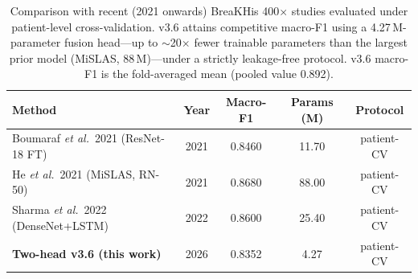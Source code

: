\begin{table}[t]
\centering
\small
\caption{Comparison with recent (2021 onwards) BreaKHis 400$\times$ studies evaluated under
patient-level cross-validation. v3.6 attains competitive macro-F1 using a 4.27\,M-parameter
fusion head---up to $\sim$20$\times$ fewer trainable parameters than the largest prior model
(MiSLAS, 88\,M)---under a strictly leakage-free protocol. v3.6 macro-F1 is the fold-averaged
mean (pooled value 0.892).}
\label{tab:sota_patient_cv_comparison}
\begin{tabular}{lcccc}
\toprule
\textbf{Method} & \textbf{Year} & \textbf{Macro-F1} & \textbf{Params (M)} & \textbf{Protocol} \\
\midrule
Boumaraf \textit{et al.}\ 2021 (ResNet-18 FT) & 2021 & 0.8460 & 11.70 & patient-CV \\
He \textit{et al.}\ 2021 (MiSLAS, RN-50) & 2021 & 0.8680 & 88.00 & patient-CV \\
Sharma \textit{et al.}\ 2022 (DenseNet+LSTM) & 2022 & 0.8600 & 25.40 & patient-CV \\
\textbf{Two-head v3.6 (this work)} & 2026 & 0.8352 & 4.27 & patient-CV \\
\bottomrule
\end{tabular}
\end{table}
